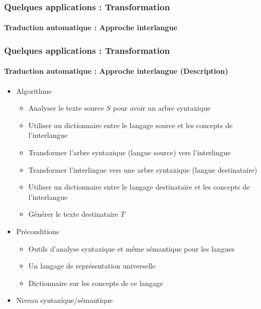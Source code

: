 \documentclass[xcolor=table]{beamer}
\begin{document}
\begin{frame}
	\frametitle{Quelques applications : Transformation}
	\framesubtitle{Traduction automatique : Approche interlangue}
\end{frame}

\begin{frame}
	\frametitle{Quelques applications : Transformation}
	\framesubtitle{Traduction automatique : Approche interlangue (Description)}
	\begin{itemize}
		\item Algorithme
		\begin{itemize}
			\item Analyser le texte source $S$ pour avoir un arbre syntaxique
			\item Utiliser un dictionnaire entre le langage source et les concepts de l'interlangue 
			\item Transformer l'arbre syntaxique (langue source) vers l'interlingue
			\item Transformer l'interlingue vers une arbre syntaxique (langue destinataire)
			\item Utiliser un dictionnaire entre le langage destinataire et les concepts de l'interlangue 
			\item Générer le texte destinataire $T$
		\end{itemize}
		\item Préconditions 
		\begin{itemize}
			\item Outils d'analyse syntaxique et même sémantique  pour les langues
			\item Un langage de représentation universelle
			\item Dictionnaire sur les concepts de ce langage
		\end{itemize}
		\item Niveau syntaxique/sémantique
	\end{itemize}
\end{frame}
\end{document}
